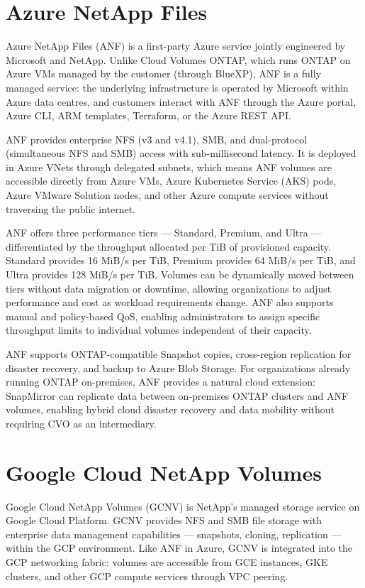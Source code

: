 \section{Azure NetApp Files}

Azure NetApp Files (ANF) is a first-party Azure service jointly engineered by Microsoft and NetApp. Unlike Cloud Volumes ONTAP, which runs ONTAP on Azure VMs managed by the customer (through BlueXP), ANF is a fully managed service: the underlying infrastructure is operated by Microsoft within Azure data centres, and customers interact with ANF through the Azure portal, Azure CLI, ARM templates, Terraform, or the Azure REST API.

ANF provides enterprise NFS (v3 and v4.1), SMB, and dual-protocol (simultaneous NFS and SMB) access with sub-millisecond latency. It is deployed in Azure VNets through delegated subnets, which means ANF volumes are accessible directly from Azure VMs, Azure Kubernetes Service (AKS) pods, Azure VMware Solution nodes, and other Azure compute services without traversing the public internet.

ANF offers three performance tiers --- Standard, Premium, and Ultra --- differentiated by the throughput allocated per TiB of provisioned capacity. Standard provides 16 MiB/s per TiB, Premium provides 64 MiB/s per TiB, and Ultra provides 128 MiB/s per TiB. Volumes can be dynamically moved between tiers without data migration or downtime, allowing organizations to adjust performance and cost as workload requirements change. ANF also supports manual and policy-based QoS, enabling administrators to assign specific throughput limits to individual volumes independent of their capacity.

ANF supports ONTAP-compatible Snapshot copies, cross-region replication for disaster recovery, and backup to Azure Blob Storage. For organizations already running ONTAP on-premises, ANF provides a natural cloud extension: SnapMirror can replicate data between on-premises ONTAP clusters and ANF volumes, enabling hybrid cloud disaster recovery and data mobility without requiring CVO as an intermediary.

\section{Google Cloud NetApp Volumes}

Google Cloud NetApp Volumes (GCNV) is NetApp's managed storage service on Google Cloud Platform. GCNV provides NFS and SMB file storage with enterprise data management capabilities --- snapshots, cloning, replication --- within the GCP environment. Like ANF in Azure, GCNV is integrated into the GCP networking fabric: volumes are accessible from GCE instances, GKE clusters, and other GCP compute services through VPC peering.


